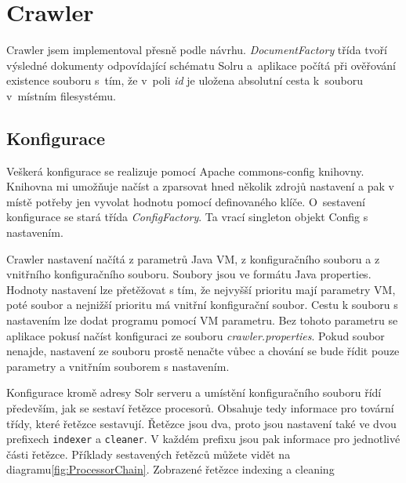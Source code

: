 \section{Crawler}
Crawler jsem implementoval přesně podle návrhu. \emph{DocumentFactory} třída tvoří výsledné dokumenty odpovídající schématu Solru a~aplikace počítá při ověřování existence souboru s~tím, že v~poli \emph{id} je  uložena absolutní cesta k~souboru v~místním filesystému.

\subsection{Konfigurace}
Veškerá konfigurace se realizuje pomocí Apache commons-config knihovny. Knihovna mi umožňuje načíst a zparsovat hned několik zdrojů nastavení a pak v místě potřeby jen vyvolat hodnotu pomocí definovaného klíče. O~sestavení konfigurace se stará třída \emph{ConfigFactory}. Ta vrací singleton objekt Config s nastavením.

Crawler nastavení načítá z parametrů Java VM, z konfiguračního souboru a z vnitřního konfiguračního souboru. Soubory jsou ve formátu Java properties. Hodnoty nastavení lze přetěžovat s tím, že nejvyšší prioritu mají parametry VM, poté soubor a nejnižší prioritu má vnitřní konfigurační soubor. Cestu k souboru s nastavením lze dodat programu pomocí VM parametru. Bez tohoto parametru se aplikace pokusí načíst konfiguraci ze souboru \emph{crawler.properties}. Pokud soubor nenajde, nastavení ze souboru prostě nenačte vůbec a chování se bude řídit pouze parametry a vnitřním souborem s nastavením.

Konfigurace kromě adresy Solr serveru a umístění konfiguračního souboru řídí především, jak se sestaví řetězce procesorů. Obsahuje tedy informace pro tovární třídy, které řetězce sestavují. Řetězce jsou dva, proto jsou nastavení také ve dvou prefixech \verb|indexer| a \verb|cleaner|. V každém prefixu jsou pak informace pro jednotlivé části řetězce. Příklady sestavených řetězců můžete vidět na diagramu\ref{fig:ProcessorChain}. Zobrazené řetězce indexing a cleaning

